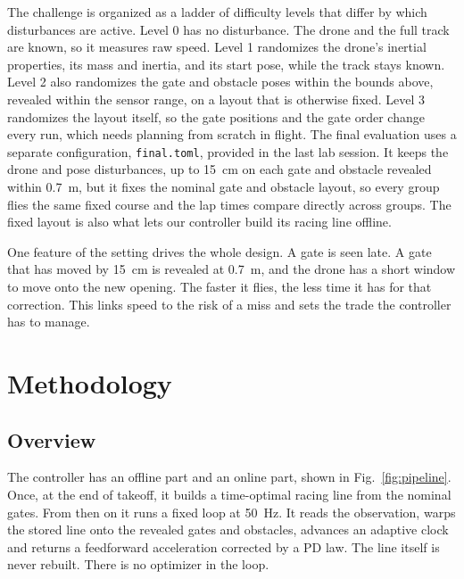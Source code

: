 \documentclass[conference]{IEEEtran}
\begin{document}
The challenge is organized as a ladder of difficulty levels that differ by which disturbances are active. Level 0 has no disturbance. The drone and the full track are known, so it measures raw speed. Level 1 randomizes the drone's inertial properties, its mass and inertia, and its start pose, while the track stays known. Level 2 also randomizes the gate and obstacle poses within the bounds above, revealed within the sensor range, on a layout that is otherwise fixed. Level 3 randomizes the layout itself, so the gate positions and the gate order change every run, which needs planning from scratch in flight. The final evaluation uses a separate configuration, \texttt{final.toml}, provided in the last lab session. It keeps the drone and pose disturbances, up to 15~cm on each gate and obstacle revealed within 0.7~m, but it fixes the nominal gate and obstacle layout, so every group flies the same fixed course and the lap times compare directly across groups. The fixed layout is also what lets our controller build its racing line offline.

One feature of the setting drives the whole design. A gate is seen late. A gate that has moved by 15~cm is revealed at 0.7~m, and the drone has a short window to move onto the new opening. The faster it flies, the less time it has for that correction. This links speed to the risk of a miss and sets the trade the controller has to manage.

\section{Methodology}
\label{sec:method}

\subsection{Overview}
The controller has an offline part and an online part, shown in Fig.~\ref{fig:pipeline}. Once, at the end of takeoff, it builds a time-optimal racing line from the nominal gates. From then on it runs a fixed loop at 50~Hz. It reads the observation, warps the stored line onto the revealed gates and obstacles, advances an adaptive clock and returns a feedforward acceleration corrected by a PD law. The line itself is never rebuilt. There is no optimizer in the loop.
\end{document}
